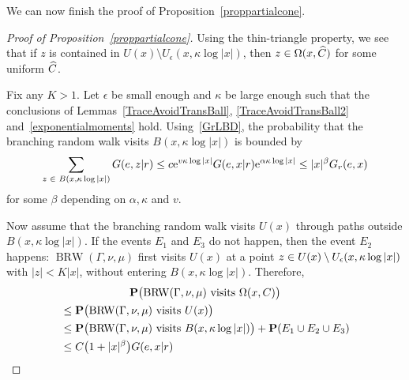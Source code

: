 \documentclass[AHL,Unicode,longabstracts]{cedram}
\newcommand{\rme}{\mathrm{e}}
\newcommand{\bfP}{\mathbf{P}}
\DeclareMathOperator{\BRW}{BRW}
\let\originalleft\left
\let\originalright\right
\renewcommand{\left}{\mathopen{}\mathclose\bgroup\originalleft}
\renewcommand{\right}{\aftergroup\egroup\originalright}
\let\oldin\in
\renewcommand{\in}{\mathchoice{\oldin}{\oldin}{\,\oldin\,}{\,\oldin\,}}
\let\oldle\le
\renewcommand{\le}{\mathchoice{\oldle}{\oldle}{\,\oldle\,}{\,\oldle\,}}
\let\oldhat\hat
\renewcommand*{\hat}[1]{\mathchoice{\widehat{#1}}{\widehat{#1}}{\oldhat{#1}}{\oldhat{#1}}}
\begin{document}
We can now finish the proof of Proposition~\ref{proppartialcone}.
\begin{proof}[Proof of Proposition~\ref{proppartialcone}]
Using the thin-triangle property, we see that if $z$ is contained in $U(x)\setminus U_{\epsilon}(x,\kappa \log |x|)$, then $z\in \Omega(x, \hat C)$ for some uniform $\hat C$.

Fix any $K>1$. Let $\epsilon$ be small enough and $\kappa$ be large enough such that the conclusions of Lemmas~\ref{TraceAvoidTransBall}, \ref{TraceAvoidTransBall2} and~\ref{exponentialmoments} hold. Using~\eqref{GrLBD}, the probability that the branching random walk visits $B(x, \kappa \log |x|)$ is bounded by
\[
\sum_{z \in B(x, \kappa \log |x|)} G(e, z|r)\le c\rme^{v\kappa \log |x|} G(e,x|r) \rme^{\alpha \kappa \log |x|}\le |x|^{\beta}G_r(e,x)
\]
for some $\beta$ depending on $\alpha, \kappa$ and $v$.

Now assume that the branching random walk visits $U(x)$ through paths outside $B(x, \kappa \log |x|)$. If the events $E_1$ and $E_3$ do not happen, then the event $E_2$ happens: $\BRW(\Gamma,\nu,\mu)$ first visits $U(x)$ {at a point} $z\in U(x)\setminus U_{\epsilon}(x,\kappa \log |x|)$ with $|z|< K|x|$, without entering $B(x, \kappa \log |x|)$. Therefore,
\begin{multline*}
\bfP\bigl(\BRW(\Gamma,\nu,\mu)\text{ visits } \Omega(x, C)\bigr)\\
\begin{aligned}
&\leq \bfP \bigl(\BRW(\Gamma,\nu,\mu)\text{ visits } U(x)\bigr) \\
&\leq \bfP\bigl(\BRW(\Gamma,\nu,\mu)\text{ visits }B(x, \kappa \log |x|)\bigr)+\bfP(E_1\cup E_2\cup E_3) \\
&\leq C\left(1+|x|^{\beta}\right)G(e,x|r) \qedhere
\end{aligned}
\end{multline*}
\end{proof}

\let\OLDthebibliography\thebibliography
\renewcommand\thebibliography[1]{
\OLDthebibliography{#1}
\setlength{\parskip}{0pt}
\setlength{\itemsep}{7pt plus 0.3ex}}


\end{document}
